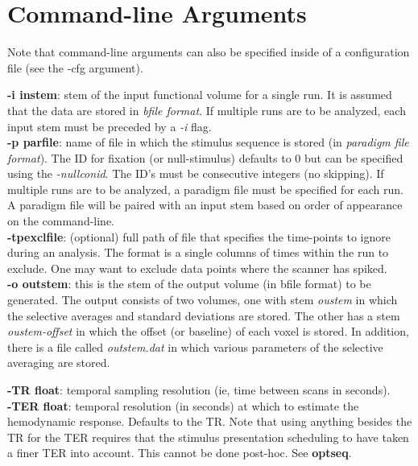 \documentclass[10pt]{article}
\begin{document}
\section{Command-line Arguments}

Note that command-line arguments can also be specified inside of a
configuration file (see the -cfg argument).

\noindent
{\bf -i instem}: stem of the input functional volume for a single run.
It is assumed that the data are stored in {\em bfile format}.  If
multiple runs are to be analyzed, each input stem must be preceded by
a {\em -i} flag.\\

\noindent
{\bf -p parfile}: name of file in which the stimulus sequence is
stored (in {\em paradigm file format}). The ID for fixation (or
null-stimulus) defaults to 0 but can be specified using the {\em
-nullconid}.  The ID's must be consecutive integers (no skipping).  If
multiple runs are to be analyzed, a paradigm file must be specified
for each run.  A paradigm file will be paired with an input stem based
on order of appearance on the command-line.\\

\noindent
{\bf -tpexclfile}: (optional) full path of file that specifies the
time-points to ignore during an analysis.  The format is a single
columns of times within the run to exclude.  One may want to exclude
data points where the scanner has spiked.\\

\noindent
{\bf -o outstem}: this is the stem of the output volume (in bfile format)
to be generated.  The output consists of two volumes, one with stem
{\em oustem} in which the selective averages and standard deviations
are stored.  The other has a stem {\em oustem-offset} in which the
offset (or baseline) of each voxel is stored.  In addition, there is
a file called {\em outstem.dat} in which various parameters of the
selective averaging are stored.

\noindent
{\bf -TR float}: temporal sampling resolution (ie, time between scans
in seconds). \\

\noindent
{\bf -TER float}: temporal resolution (in seconds) at which to
estimate the hemodynamic response.  Defaults to the TR.  Note that
using anything besides the TR for the TER requires that the stimulus
presentation scheduling to have taken a finer TER into account.  This
cannot be done post-hoc. See {\bf optseq}.\\
\end{document}
